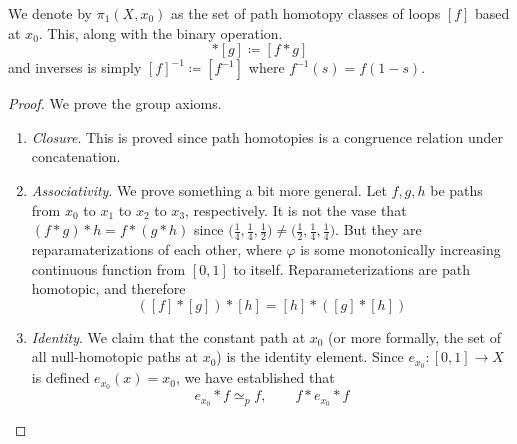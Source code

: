   \begin{definition}
    We denote by $\pi_1 (X, x_0)$ as the set of path homotopy classes of loops $[f]$ based at $x_0$. This, along with the binary operation. 
    \begin{equation}
      [f] \ast [g] \coloneqq [f \ast g] 
    \end{equation}
    and inverses is simply $[f]^{-1} \coloneqq [f^{-1}]$ where $f^{-1} (s) = f(1 - s)$. 
  \end{definition}
  \begin{proof}
    We prove the group axioms. 
    \begin{enumerate}
      \item \textit{Closure}. This is proved since path homotopies is a congruence relation under concatenation. 
      \item \textit{Associativity}. We prove something a bit more general. Let $f, g, h$ be paths from $x_0$ to $x_1$ to $x_2$ to $x_3$, respectively.  It is not the vase that $(f \ast g) \ast h = f \ast (g \ast h)$ since $\big( \frac{1}{4}, \frac{1}{4}, \frac{1}{2} \big) \neq \big( \frac{1}{2}, \frac{1}{4}, \frac{1}{4} \big)$. But they are reparamaterizations of each other, where $\varphi$ is some monotonically increasing continuous function from $[0, 1]$ to itself. Reparameterizations are path homotopic, and therefore 
        \begin{equation}
          ([f] \ast [g]) \ast [h] = [h] \ast ([g] \ast [h]) 
        \end{equation}

      \item \textit{Identity}. We claim that the constant path at $x_0$ (or more formally, the set of all null-homotopic paths at $x_0$) is the identity element. Since $e_{x_0}: [0, 1] \to X$ is defined $e_{x_0} (x) = x_{0}$, we have established that 
        \begin{equation}
          e_{x_0} \ast f \simeq_p f, \qquad f \ast e_{x_0} \ast f
        \end{equation}


\end{enumerate}
\end{proof}
